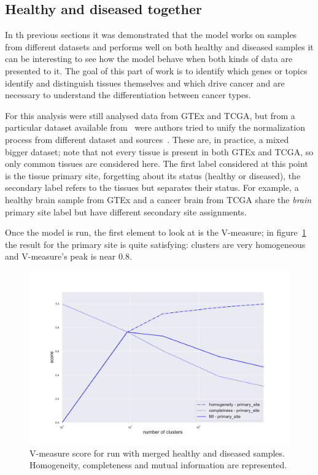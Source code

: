 \subsection{Healthy and diseased together}
In th previous sections it was demonstrated that the model works on samples from different datasets and performs well on both healthy and diseased samples it can be interesting to see how the model behave when both kinds of data are presented to it.
The goal of this part of work is to identify which genes or topics identify and distinguish tissues themselves and which drive cancer and are necessary to understand the differentiation between cancer types.

For this analysis were still analysed data  from GTEx and TCGA, but from a particular dataset available from~\cite{Wang2017} were authors tried to unify the normalization process from different dataset and sources~\cite{Betel2018}. These are, in practice, a mixed bigger dataset; note that not every tissue is present in both GTEx and TCGA, so only common tissues are considered here. The first label considered at this point is the tissue primary site, forgetting about its status (healthy or diseased), the secondary label refers to the tissues but separates their status. For example, a healthy brain sample from GTEx and a cancer brain from TCGA share the \textit{brain} primary site label but have different secondary site assignments.

Once the model is run, the first element to look at is the V-measure; in figure~\ref{fig:topic/merged/metric_scores_primarysite} the result for the primary site is quite satisfying: clusters are very homogeneous and V-measure's peak is near $0.8$.
\begin{figure}[htb!]
    \centering
    \includegraphics[width=0.8\linewidth]{pictures/topic/merged/metric_scores_primarysite.pdf}
    \caption{V-measure score for run with merged healthy and diseased samples. Homogeneity, completeness and mutual information are represented.}
    \label{fig:topic/merged/metric_scores_primarysite}
\end{figure}

